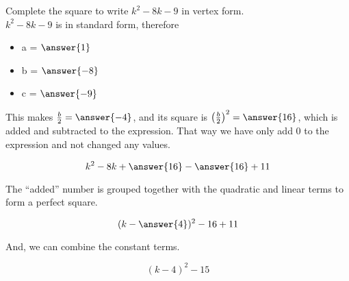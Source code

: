 \documentclass{ximera}
\author{Lee Wayand}
\begin{document}
\begin{exercise} 


Complete the square to write $k^2 - 8k - 9$ in vertex form. \\



$k^2 - 8k - 9$ is in standard form, therefore



\begin{itemize}
\item  a = $\answer{1}$ \\
\item  b = $\answer{-8}$ \\
\item  c = $\answer{-9}$ \\
\end{itemize}



This makes $\frac{b}{2} = \answer{-4}$, and its square is $\left( \frac{b}{2} \right)^2 = \answer{16}$, which is added and subtracted to the expression.  That way we have only add $0$ to the expression and not changed any values. 


\[ k^2 - 8k + \answer{16} - \answer{16} + 11 \]



The ``added'' number is grouped together with the quadratic and linear terms to form a perfect square.



\[ ( k - \answer{4} )^2  - 16 + 11 \]

And, we can combine the constant terms.



\[  ( k - 4 )^2  - 15  \]



\end{exercise}
\end{document}
